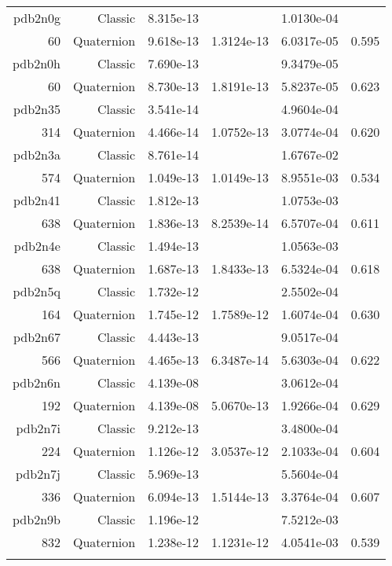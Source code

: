 \begin{xltabular}{\textwidth}{r|rS[table-format=1.3e+2]S[table-format=1.4e+2]S[table-format=1.4e+2]S[table-format=-1.3]}
pdb2n0g & Classic & 8.315e-13 &  & 1.0130e-04 & \\
60 & Quaternion & 9.618e-13 & 1.3124e-13 & 6.0317e-05 & 0.595\\  \addlinespace
pdb2n0h & Classic & 7.690e-13 &  & 9.3479e-05 & \\
60 & Quaternion & 8.730e-13 & 1.8191e-13 & 5.8237e-05 & 0.623\\  \addlinespace
pdb2n35 & Classic & 3.541e-14 &  & 4.9604e-04 & \\
314 & Quaternion & 4.466e-14 & 1.0752e-13 & 3.0774e-04 & 0.620\\  \addlinespace
{\color{red} pdb2n3a } & Classic & 8.761e-14 &  & 1.6767e-02 & \\
574 & Quaternion & 1.049e-13 & 1.0149e-13 & 8.9551e-03 & 0.534\\  \addlinespace
pdb2n41 & Classic & 1.812e-13 &  & 1.0753e-03 & \\
638 & Quaternion & 1.836e-13 & 8.2539e-14 & 6.5707e-04 & 0.611\\  \addlinespace
pdb2n4e & Classic & 1.494e-13 &  & 1.0563e-03 & \\
638 & Quaternion & 1.687e-13 & 1.8433e-13 & 6.5324e-04 & 0.618\\  \addlinespace
pdb2n5q & Classic & 1.732e-12 &  & 2.5502e-04 & \\
164 & Quaternion & 1.745e-12 & 1.7589e-12 & 1.6074e-04 & 0.630\\  \addlinespace
pdb2n67 & Classic & 4.443e-13 &  & 9.0517e-04 & \\
566 & Quaternion & 4.465e-13 & 6.3487e-14 & 5.6303e-04 & 0.622\\  \addlinespace
pdb2n6n & Classic & 4.139e-08 &  & 3.0612e-04 & \\
192 & Quaternion & 4.139e-08 & 5.0670e-13 & 1.9266e-04 & 0.629\\  \addlinespace
pdb2n7i & Classic & 9.212e-13 &  & 3.4800e-04 & \\
224 & Quaternion & 1.126e-12 & 3.0537e-12 & 2.1033e-04 & 0.604\\  \addlinespace
pdb2n7j & Classic & 5.969e-13 &  & 5.5604e-04 & \\
336 & Quaternion & 6.094e-13 & 1.5144e-13 & 3.3764e-04 & 0.607\\  \addlinespace
{\color{red} pdb2n9b } & Classic & 1.196e-12 &  & 7.5212e-03 & \\
832 & Quaternion & 1.238e-12 & 1.1231e-12 & 4.0541e-03 & 0.539\\  \addlinespace

\end{xltabular}
